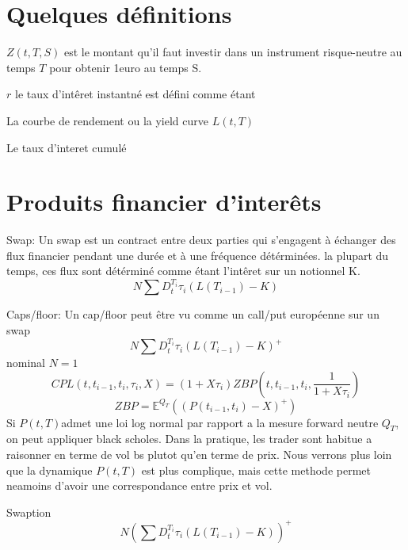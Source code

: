 

\section{Quelques définitions}
\begin{theorem}
$Z(t, T, S)$ est le montant qu'il faut investir dans un instrument risque-neutre au temps $T$ pour obtenir 1euro au temps S.
\end{theorem}
\begin{theorem}
$r$ le taux d'intêret instantné est défini comme étant
\end{theorem}
\begin{theorem}
La courbe de rendement ou la yield curve $L(t, T)$
\end{theorem}
\begin{theorem}
Le taux d'interet cumulé
\end{theorem}

\newpage
\section{Produits financier d'interêts}
\begin{theorem}Swap:
Un swap est un contract entre deux parties qui s'engagent à échanger des flux financier pendant une durée et à une fréquence détérminées. la plupart du temps, ces flux sont détérminé comme étant l'intêret sur un notionnel K. 
$$ N \sum D_t^{T_i} \tau_i (L(T_{i-1}) - K) $$
\end{theorem}

Caps/floor:
Un cap/floor peut être vu comme un call/put européenne sur un swap
$$ N \sum D_t^{T_i} \tau_i (L(T_{i-1}) - K)^+ $$
nominal $N = 1$
$$ CPL(t, t_{i-1}, t_i, \tau_i, X) = (1+X \tau_i) ZBP(t, t_{i-1}, t_i, \frac{1}{1+X \tau_i})$$
$$ZBP = \mathbb{E}^{Q_T}(  (P(t_{i-1}, t_i) - X)^+ )$$
Si $P(t, T)$admet une loi log normal par rapport a la mesure forward neutre $Q_T$, on peut appliquer black scholes. Dans la pratique, les trader sont habitue a raisonner en terme de vol bs plutot qu'en terme de prix. Nous verrons plus loin que la dynamique $P(t, T)$ est plus complique, mais cette methode permet neamoins d'avoir une correspondance entre prix et vol.

Swaption
$$ N (\sum D_t^{T_i} \tau_i (L(T_{i-1}) - K))^+ $$

